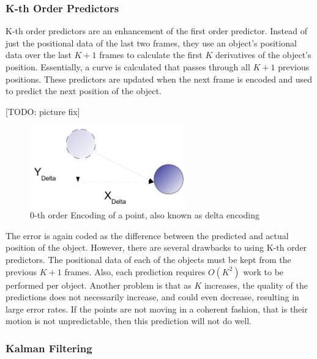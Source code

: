 \documentclass[a4paper,11pt]{report}
\begin{document}
\subsubsection{K-th Order Predictors}

K-th order predictors are an enhancement of the first order predictor. Instead of just the positional data of the last two frames, they use an object's positional data over the last $K+1$ frames to calculate the first $K$ derivatives of the object's position. Essentially, a curve is calculated that passes through all $K+1$ previous positions. These predictors are updated when the next frame is encoded and used to predict the next position of the object.

[TODO: picture fix]
\begin{figure}[h]
 \center
 \includegraphics[width=0.6\textwidth]{resources/DeltaEncoding.png}
\caption{0-th order Encoding of a point, also known as delta encoding}
\label{deltaencoding}
\end{figure}

The error is again coded as the difference between the predicted and actual position of the object. However, there are several drawbacks to using K-th order predictors. The positional data of each of the objects must be kept from the previous $K+1$ frames. Also, each prediction requires $O(K^2)$ work to be performed per object. Another problem is that as $K$ increases, the quality of the predictions does not necessarily increase, and could even decrease, resulting in large error rates. If the points are not moving in a coherent fashion, that is their motion is not unpredictable, then this prediction will not do well.

\subsubsection{Kalman Filtering}
\end{document}
